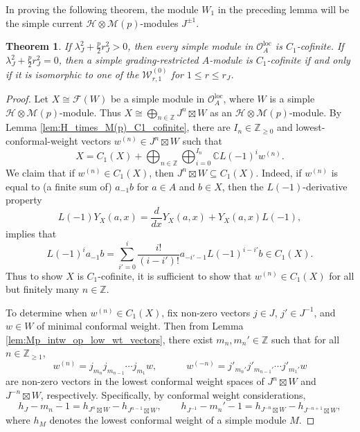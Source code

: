 \documentclass[11pt, reqno]{amsart}
\newtheorem{thm}{Theorem}[section]
\theoremstyle{definition}\newtheorem{defi}[thm]{Definition}
\theoremstyle{definition}\newtheorem{rem}[thm]{Remark}
\theoremstyle{definition}\newtheorem{exam}[thm]{Example}
\theoremstyle{definition}\newtheorem{assum}[thm]{Assumption}
\newcommand{\cH}{\mathcal{H}}
\newcommand{\cM}{\mathcal{M}}
\newcommand{\cF}{\mathcal{F}}
\newcommand{\cO}{\mathcal{O}}
\newcommand{\cW}{\mathcal{W}}
\newcommand{\CC}{\mathbb{C}}
\newcommand{\ZZ}{\mathbb{Z}}
\newcommand{\tens}{\boxtimes}
\newcommand{\Oloc}{\cO^{\mathrm{loc}}}
\begin{document}
 In proving the following theorem, the module $W_1$ in the preceding lemma will be the simple current $\cH\otimes\cM(p)$-modules $J^{\pm 1}$. 
 \begin{thm}\label{thm:simple_C1_cofinite}
 If $\lambda_J^2+\frac{p}{2}r_J^2>0$, then every simple module in $\Oloc_A$ is $C_1$-cofinite. If $\lambda_J^2+\frac{p}{2}r_J^2=0$, then a simple grading-restricted $A$-module is $C_1$-cofinite if and only if it is isomorphic to one of the $\cW_{r,1}^{(0)}$ for $1\leq r\leq r_J$.
 \end{thm}
 \begin{proof}
Let $X\cong\cF(W)$ be a simple module in $\Oloc_A$, where $W$ is a simple $\cH\otimes\cM(p)$-module. Thus $X\cong\bigoplus_{n\in\ZZ} J^n\tens W$ as an $\cH\otimes\cM(p)$-module. By Lemma \ref{lem:H_times_M(p)_C1_cofinite}, there are $I_n\in\ZZ_{\geq 0}$ and lowest-conformal-weight vectors $w^{(n)}\in J^n\tens W$ such that
\begin{equation*}
X = C_1(X)+\bigoplus_{n\in\ZZ}\bigoplus_{i=0}^{I_n} \CC L(-1)^i w^{(n)}.
\end{equation*}
 We claim that if $w^{(n)}\in C_1(X)$, then $J^n\tens W\subseteq C_1(X)$. Indeed, if $w^{(n)}$ is equal to (a finite sum of) $a_{-1} b$ for $a\in A$ and $b\in X$, then  the $L(-1)$-derivative property
 \begin{equation*}
 L(-1)Y_X(a,x)=\frac{d}{dx}Y_X(a,x)+Y_X(a,x)L(-1),
 \end{equation*}
 implies that
 \begin{equation*}
 L(-1)^i a_{-1} b=\sum_{i'=0}^i \frac{i!}{(i-i')!} a_{-i'-1} L(-1)^{i-i'}b\in C_1(X).
 \end{equation*}
 Thus to show $X$ is $C_1$-cofinite, it is sufficient to show that $w^{(n)}\in C_1(X)$ for all but finitely many $n\in\ZZ$.
 
 
To determine when $w^{(n)}\in C_1(X)$, fix non-zero vectors $j\in J$, $j'\in J^{-1}$, and $w\in W$ of minimal conformal weight. Then from Lemma \ref{lem:Mp_intw_op_low_wt_vectors}, there exist $m_n, m_n'\in\ZZ$ such that for all $n\in\ZZ_{\geq 1}$,
 \begin{equation*}
w^{(n)} = j_{m_n}j_{m_{n-1}}\cdots j_{m_1} w,\qquad\quad w^{(-n)} = j'_{m_n'} j'_{m_{n-1}'}\cdots j'_{m_1'} w
 \end{equation*}
 are non-zero vectors in the lowest conformal weight spaces of $J^n\tens W$ and $J^{-n}\tens W$, respectively. Specifically, by conformal weight considerations,
 \begin{equation*}
 h_J-m_n-1 = h_{J^n\tens W}-h_{J^{n-1}\tens W},\qquad h_{J^{-1}} -m_n'-1=h_{J^{-n}\tens W}-h_{J^{-n+1}\tens W}, 
 \end{equation*}
 where $h_M$ denotes the lowest conformal weight of a simple module $M$.
 

\end{proof}
\end{document}
